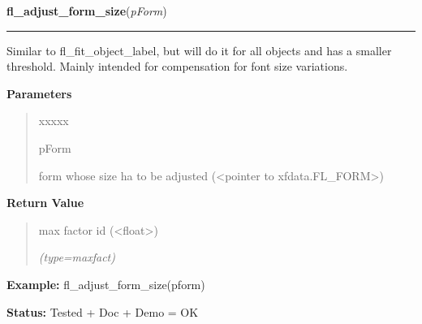     \label{xformslib:library:fl_adjust_form_size}

    \vspace{0.5ex}

\hspace{.8\funcindent}\begin{boxedminipage}{\funcwidth}

    \raggedright \textbf{fl\_adjust\_form\_size}(\textit{pForm})

    \vspace{-1.5ex}

    \rule{\textwidth}{0.5\fboxrule}
\setlength{\parskip}{2ex}
    Similar to fl\_fit\_object\_label, but will do it for all objects and 
    has a smaller threshold. Mainly intended for compensation for font size
    variations.

\setlength{\parskip}{1ex}
      \textbf{Parameters}
      \vspace{-1ex}

      \begin{quote}
        \begin{Ventry}{xxxxx}

          \item[pForm]

          form whose size ha to be adjusted ({\textless}pointer to 
          xfdata.FL\_FORM{\textgreater})

        \end{Ventry}

      \end{quote}

      \textbf{Return Value}
    \vspace{-1ex}

      \begin{quote}
      max factor id ({\textless}float{\textgreater})

      {\it (type=maxfact)}

      \end{quote}

\textbf{Example:} fl\_adjust\_form\_size(pform)



\textbf{Status:} Tested + Doc + Demo = OK



    \end{boxedminipage}

    \label{xformslib:library:fl_form_is_visible}

